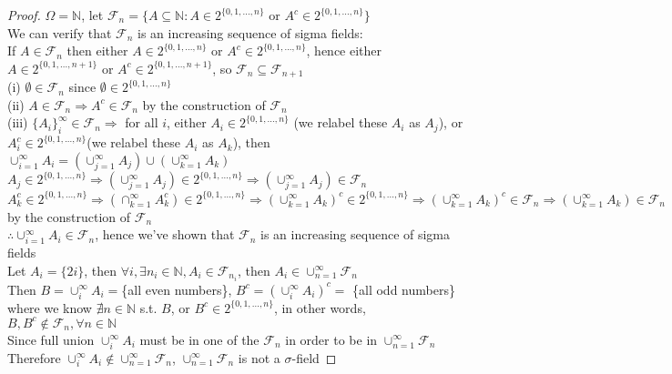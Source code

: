 \documentclass[12pt]{article}
\newenvironment{problem}[2][Problem]{\begin{trivlist}
\item[\hskip \labelsep {\bfseries #1}\hskip \labelsep {\bfseries #2.}]}{\end{trivlist}}
\begin{document}
\begin{problem}{2(b)}
\end{problem}
\begin{proof}
$\Omega = \mathbb{N}$, let $\mathcal{F}_{n} = \{A \subseteq \mathbb{N}: A \in 2^{\{0,1,...,n\}}$ or $A^c \in 2^{\{0,1,...,n\}}\}$\\
We can verify that $\mathcal{F}_{n}$ is an increasing sequence of sigma fields:\\
If $A \in \mathcal{F}_{n}$ then either $A \in 2^{\{0,1,...,n\}}$ or $A^c \in 2^{\{0,1,...,n\}}$, hence either $A \in 2^{\{0,1,...,n+1\}}$ or $A^c \in 2^{\{0,1,...,n+1\}}$, so $\mathcal{F}_{n} \subseteq \mathcal{F}_{n+1}$\\
(i) $\emptyset \in \mathcal{F}_{n}$ since $\emptyset \in  2^{\{0,1,...,n\}}$\\
(ii) $A \in \mathcal{F}_{n} \Rightarrow A^c \in \mathcal{F}_{n}$ by the construction of $\mathcal{F}_{n}$\\
(iii) $\{A_{i}\}_{i}^{\infty} \in \mathcal{F}_{n} \Rightarrow$ for all $i$, either $A_{i} \in 2^{\{0,1,...,n\}}$ (we relabel these $A_{i}$ as $A_{j}$), or  $A^c_{i} \in 2^{\{0,1,...,n\}}$(we relabel these $A_{i}$ as $A_{k}$), then $\cup_{i=1}^{\infty}A_{i} = (\cup_{j=1}^{\infty}A_{j}) \cup (\cup_{k=1}^{\infty}A_{k})$\\
$A_{j} \in 2^{\{0,1,...,n\}} \Rightarrow (\cup_{j=1}^{\infty}A_{j}) \in 2^{\{0,1,...,n\}} \Rightarrow (\cup_{j=1}^{\infty}A_{j}) \in \mathcal{F}_{n}$\\
$A^c_{k} \in  2^{\{0,1,...,n\}} \Rightarrow (\cap_{k=1}^{\infty}A^c_{k}) \in 2^{\{0,1,...,n\}} \Rightarrow (\cup_{k=1}^{\infty}A_{k})^c \in 2^{\{0,1,...,n\}} \Rightarrow (\cup_{k=1}^{\infty}A_{k})^c \in \mathcal{F}_{n} \Rightarrow (\cup_{k=1}^{\infty}A_{k}) \in \mathcal{F}_{n}$ by the construction of $\mathcal{F}_{n}$\\
$\therefore \cup_{i=1}^{\infty}A_{i} \in \mathcal{F}_{n}$, hence we've shown that $\mathcal{F}_{n}$ is an increasing sequence of sigma fields\\
Let $A_{i} = \{2i\}$, then $\forall i, \exists n_{i} \in \mathbb{N}, A_{i} \in \mathcal{F}_{n_{i}}$, then $A_{i} \in \cup_{n=1}^{\infty}\mathcal{F}_{n}$\\
Then $B = \cup_{i}^{\infty}A_{i} = $\{all even numbers\}, $B^c = (\cup_{i}^{\infty}A_{i})^c = $ \{all odd numbers\} \\
where we know $\nexists n \in \mathbb{N}$ s.t. $B$, or $B^c \in 2^{\{0,1,...,n\}}$, in other words, $B, B^c \not\in \mathcal{F}_{n}, \forall n \in \mathbb{N}$\\
Since full union $\cup_{i}^{\infty}A_{i}$ must be in one of the $\mathcal{F}_{n}$ in order to be in $\cup_{n=1}^{\infty}\mathcal{F}_{n}$\\
Therefore $\cup_{i}^{\infty}A_{i} \not\in \cup_{n=1}^{\infty}\mathcal{F}_{n}$, $\cup_{n=1}^{\infty}\mathcal{F}_{n}$ is not a $\sigma$-field
\end{proof}
\end{document}
